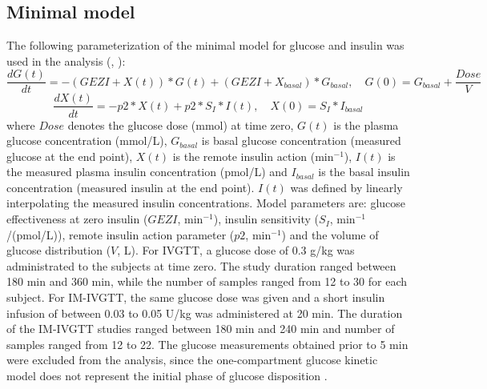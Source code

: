 \documentclass[utf8]{frontiersSCNS} %
\begin{document}
\subsection{Minimal model}
The following parameterization of the minimal model for glucose and insulin was used in the analysis (\citet{Bergman1979}, \citet{Araujo-vilar1998}):
\begin{equation}
\frac{dG(t)}{dt} =-(GEZI+X(t))*G(t)+(GEZI+X_{basal})*G_{basal}, \quad G(0) =G_{basal}+\frac{Dose}{V}\label{eq:01}
\end{equation}
\begin{equation}
\frac{dX(t)}{dt} =-p2*X(t)+p2*S_I*I(t), \quad X(0) =S_I*I_{basal}\label{eq:02}
\end{equation}
where $Dose$ denotes the glucose dose (mmol) at time zero, $G(t)$ is the plasma glucose concentration (mmol/L), $G_{basal}$ is basal glucose concentration (measured glucose at the end point), $X(t)$ is the remote insulin action (min$^{-1}$), $I(t)$ is the measured plasma insulin concentration (pmol/L) and $I_{basal}$ is the basal insulin concentration (measured insulin at the end point). $I(t)$ was defined by linearly interpolating the measured insulin concentrations. Model parameters are: glucose effectiveness at zero insulin ($GEZI$, min$^{-1}$), insulin sensitivity ($S_I$, min$^{-1}$/(pmol/L)), remote insulin action parameter ($p2$, min$^{-1}$) and the volume of glucose distribution ($V$, L). For IVGTT, a glucose dose of 0.3 g/kg was administrated to the subjects at time zero. The study duration ranged between 180 min and 360 min, while the number of samples ranged from 12 to 30 for each subject. For IM-IVGTT, the same glucose dose was given and a short insulin infusion of between 0.03 to 0.05 U/kg was administered at 20 min. The duration of the IM-IVGTT studies ranged between 180 min and 240 min and number of samples ranged from 12 to 22. The glucose measurements obtained prior to 5 min were excluded from the analysis, since the one-compartment glucose kinetic model does not represent the initial phase of glucose disposition \citep{Vicini1999}.

\vskip 0.75cm
\end{document}
